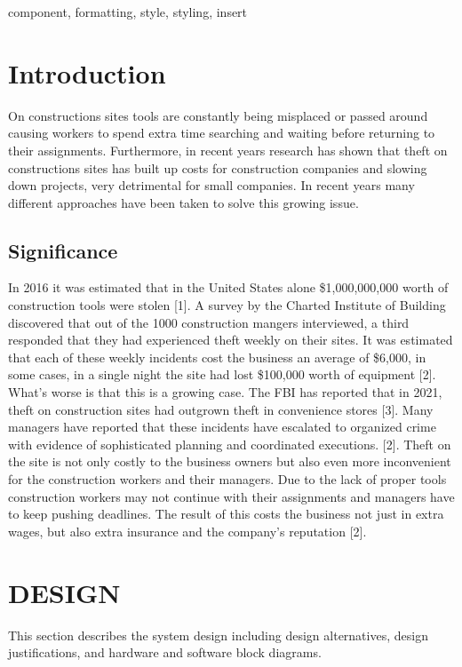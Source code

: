 \documentclass[conference]{IEEEtran}
\begin{document}
\begin{IEEEkeywords}
component, formatting, style, styling, insert
\end{IEEEkeywords}

\section{Introduction}
On constructions sites tools are constantly being misplaced or passed around causing workers to spend extra time searching and waiting before returning to their assignments. Furthermore, in recent years research has shown that theft on constructions sites has built up costs for construction companies and slowing down projects, very detrimental for small companies. In recent years many different approaches have been taken to solve this growing issue. 
\subsection{Significance}
In 2016 it was estimated that in the United States alone \$1,000,000,000 worth of construction tools were stolen [1]. A survey by the Charted Institute of Building discovered that out of the 1000 construction mangers interviewed, a third responded that they had experienced theft weekly on their sites. It was estimated that each of these weekly incidents cost the business an average of \$6,000, in some cases, in a single night the site had lost \$100,000 worth of equipment [2]. What’s worse is that this is a growing case. The FBI has reported that in 2021, theft on construction sites had outgrown theft in convenience stores [3]. Many managers have reported that these incidents have escalated to organized crime with evidence of sophisticated planning and coordinated executions. [2]. Theft on the site is not only costly to the business owners but also even more inconvenient for the construction workers and their managers. Due to the lack of proper tools construction workers may not continue with their assignments and managers have to keep pushing deadlines. The result of this costs the business not just in extra wages, but also extra insurance and the company’s reputation [2]. 

\section{DESIGN}

This section describes the system design including design alternatives, design justifications, and hardware and software block diagrams.
\end{document}
